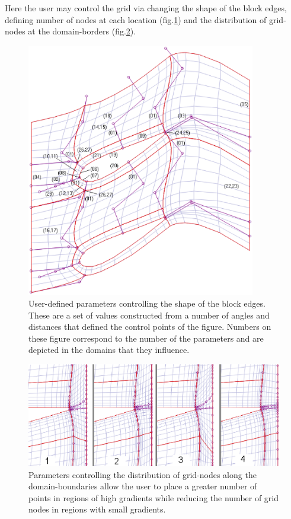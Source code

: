 Here the user may control the grid via changing the shape of the block edges, defining number of nodes at each location (fig.\ref{grid2}) and  the distribution of grid-nodes at the domain-borders (fig.\ref{grid3}).                      


\begin{figure}[h!]
\centering
\includegraphics[width=100mm]{cGridSkParam.eps} 
\caption{User-defined parameters controlling the shape of the block edges. These are a set of values constructed from a number of angles and distances that defined the control points of the figure. Numbers on these figure correspond to the number of the parameters and are depicted in the domains that they influence.}
\label{grid2}
\end{figure}

\begin{figure}[h!]
\centering
\includegraphics[width=120mm]{sketchDistrEast.eps} 
\caption{Parameters controlling the distribution of grid-nodes along the domain-boundaries allow the user to place a greater number of points in regions of high gradients while reducing the number of grid nodes in regions with small gradients.}
\label{grid3}
\end{figure}

